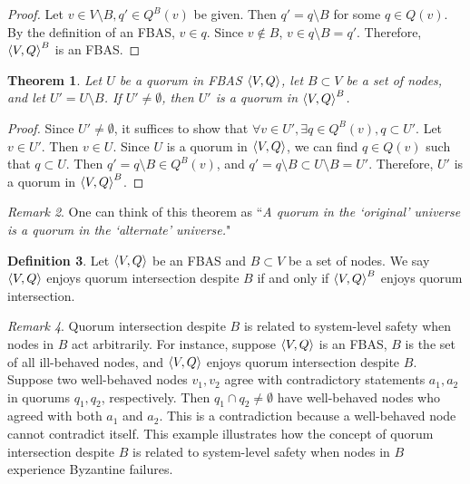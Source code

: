 \documentclass[12pt, psamsfonts]{amsart}
\newtheorem{thm}{Theorem}[section]
\theoremstyle{definition}
\newtheorem{defn}[thm]{Definition}
\theoremstyle{remark}
\newtheorem{rem}[thm]{Remark}
\numberwithin{equation}{section}
\begin{document}
\begin{proof}
    Let $v \in V \setminus B, q' \in Q^B(v)$ be given.
    Then $q' = q \setminus B$ for some $q \in Q(v)$.
    By the definition of an FBAS, $v \in q$.
    Since $v \notin B$, $v \in q \setminus B = q'$.
    Therefore, $\ev{V, Q}^B$ is an FBAS\@.
\end{proof}

\begin{thm}\label{quorum_delete_fbas}
    Let $U$ be a quorum in FBAS $\ev{V, Q}$, let $B \subset V$ be a set of nodes, and let $U' = U \setminus B$.
    If $U' \ne \emptyset$, then $U'$ is a quorum in $\ev{V, Q}^B$.
\end{thm}

\begin{proof}
    Since $U' \ne \emptyset$, it suffices to show that $\forall v \in U', \exists q \in Q^B(v), q \subset U'$.
    Let $v \in U'$.
    Then $v \in U$.
    Since $U$ is a quorum in $\ev{V, Q}$, we can find $q \in Q(v)$ such that $q \subset U$.
    Then $q' = q \setminus B \in Q^B(v)$, and $q' = q \setminus B \subset U \setminus B = U'$.
    Therefore, $U'$ is a quorum in $\ev{V, Q}^B$.
\end{proof}

\begin{rem}
    One can think of this theorem as ``\textit{A quorum in the `original' universe is a quorum in the `alternate' universe.}"
\end{rem}

\begin{defn}
    Let $\ev{V, Q}$ be an FBAS and $B \subset V$ be a set of nodes.
    We say $\ev{V, Q}$ enjoys quorum intersection despite $B$ if and only if $\ev{V, Q}^B$ enjoys quorum intersection.
\end{defn}

\begin{rem}
    Quorum intersection despite $B$ is related to system-level safety when nodes in $B$ act arbitrarily.
    For instance, suppose $\ev{V, Q}$ is an FBAS, $B$ is the set of all ill-behaved nodes, and $\ev{V, Q}$ enjoys quorum intersection despite $B$.
    Suppose two well-behaved nodes $v_1, v_2$ agree with contradictory statements $a_1, a_2$ in quorums $q_1, q_2$, respectively.
    Then $q_1 \cap q_2 \ne \emptyset$ have well-behaved nodes who agreed with both $a_1$ and $a_2$.
    This is a contradiction because a well-behaved node cannot contradict itself.
    This example illustrates how the concept of quorum intersection despite $B$ is related to system-level safety when nodes in $B$ experience Byzantine failures.
\end{rem}
\end{document}
